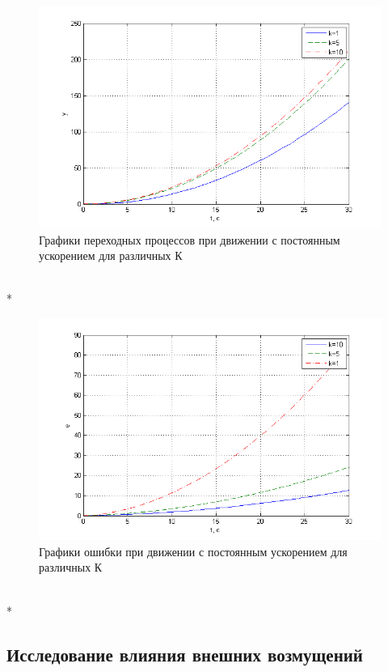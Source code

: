 \documentclass[a4paper, 12pt]{article}
\begin{document}
\begin{figure}[h!]
	\centering
	\includegraphics[width = 1\textwidth]{hinh10}
	\caption{Графики переходных процессов при движении с постоянным ускорением для различных К}
\end{figure}\hfill\\*
\newpage
\begin{figure}[h]
	\centering
	\includegraphics[width = 1\textwidth]{hinh9}
	\caption{Графики ошибки при движении с постоянным ускорением для различных К}
\end{figure}\hfill\\*
\newpage
\begin{center}
	\newpage
	\section*{ Исследование влияния внешних возмущений}
\end{center}\par
\end{document}
